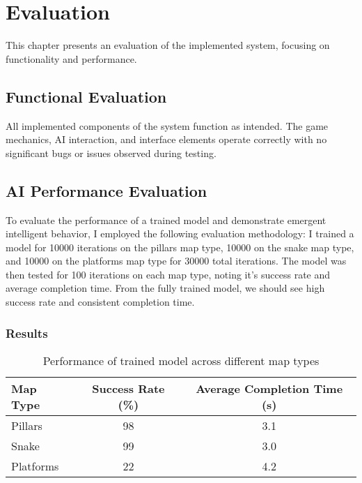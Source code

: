 \chapter{Evaluation}

This chapter presents an evaluation of the implemented system, focusing on functionality and performance.

\section{Functional Evaluation}
All implemented components of the system function as intended. The game mechanics, AI interaction, and interface elements operate correctly with no significant bugs or issues observed during testing.

\section{AI Performance Evaluation}
To evaluate the performance of a trained model and demonstrate emergent intelligent behavior, I employed the following evaluation methodology:
I trained a model for 10000 iterations on the pillars map type, 10000 on the snake map type, and 10000 on the platforms map type for 30000 total iterations.
The model was then tested for 100 iterations on each map type, noting it's success rate and average completion time.
From the fully trained model, we should see high success rate and consistent completion time.

\subsection{Results}

\begin{table}[ht]
\centering
\begin{tabular}{|l|c|c|}
\hline
\textbf{Map Type} & \textbf{Success Rate (\%)} & \textbf{Average Completion Time (s)} \\
\hline
Pillars & 98 & 3.1 \\
\hline
Snake & 99 & 3.0 \\
\hline
Platforms & 22 & 4.2 \\
\hline
\end{tabular}
\caption{Performance of trained model across different map types}
\label{tab:model_performance}
\end{table}

